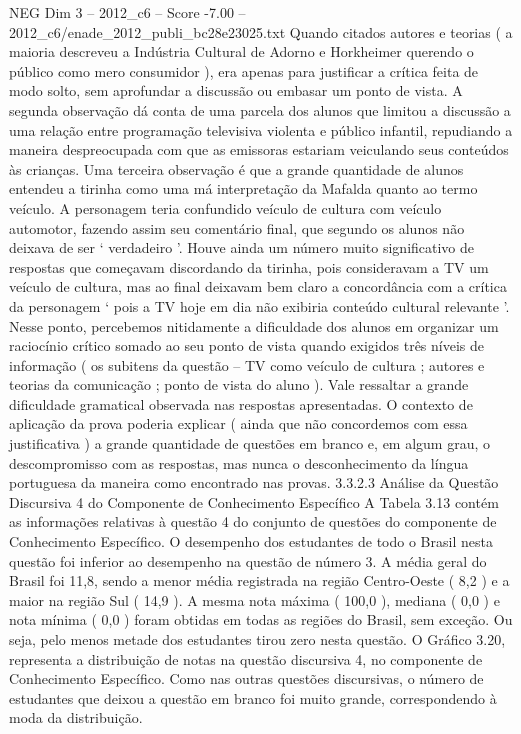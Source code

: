 \begin{textsample}{NEG Dim 3 – 2012\_c6 – Score -7.00 – 2012\_c6/enade\_2012\_publi\_bc28e23025.txt}
Quando citados autores e teorias ( a maioria descreveu a Indústria Cultural de Adorno e Horkheimer querendo o público como mero consumidor ), era apenas para justificar a crítica feita de modo solto, sem aprofundar a discussão ou embasar um ponto de vista.
A segunda observação dá conta de uma parcela dos alunos que limitou a discussão a uma relação entre programação televisiva violenta e público infantil, repudiando a maneira despreocupada com que as emissoras estariam veiculando seus conteúdos às crianças.
Uma terceira observação é que a grande quantidade de alunos entendeu a tirinha como uma má interpretação da Mafalda quanto ao termo veículo.
A personagem teria confundido veículo de cultura com veículo automotor, fazendo assim seu comentário final, que segundo os alunos não deixava de ser ‘ verdadeiro ’.
Houve ainda um número muito significativo de respostas que começavam discordando da tirinha, pois consideravam a TV um veículo de cultura, mas ao final deixavam bem claro a concordância com a crítica da personagem ‘ pois a TV hoje em dia não exibiria conteúdo cultural relevante ’.
Nesse ponto, percebemos nitidamente a dificuldade dos alunos em organizar um raciocínio crítico somado ao seu ponto de vista quando exigidos três níveis de informação ( os subitens da questão – TV como veículo de cultura ; autores e teorias da comunicação ; ponto de vista do aluno ).
Vale ressaltar a grande dificuldade gramatical observada nas respostas apresentadas.
O contexto de aplicação da prova poderia explicar ( ainda que não concordemos com essa justificativa ) a grande quantidade de questões em branco e, em algum grau, o descompromisso com as respostas, mas nunca o desconhecimento da língua portuguesa da maneira como encontrado nas provas. 3.3.2.3 Análise da Questão Discursiva 4 do Componente de Conhecimento Específico A Tabela 3.13 contém as informações relativas à questão 4 do conjunto de questões do componente de Conhecimento Específico.
O desempenho dos estudantes de todo o Brasil nesta questão foi inferior ao desempenho na questão de número 3.
A média geral do Brasil foi 11,8, sendo a menor média registrada na região Centro-Oeste ( 8,2 ) e a maior na região Sul ( 14,9 ).
A mesma nota máxima ( 100,0 ), mediana ( 0,0 ) e nota mínima ( 0,0 ) foram obtidas em todas as regiões do Brasil, sem exceção.
Ou seja, pelo menos metade dos estudantes tirou zero nesta questão.
O Gráfico 3.20, representa a distribuição de notas na questão discursiva 4, no componente de Conhecimento Específico.
Como nas outras questões discursivas, o número de estudantes que deixou a questão em branco foi muito grande, correspondendo à moda da distribuição.

\end{textsample}
